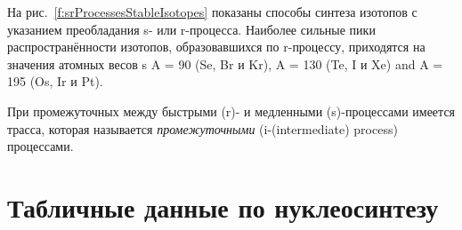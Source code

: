 \documentclass[a5paper,openany]{book}
\begin{document}



На рис.~\ref{f:srProcessesStableIsotopes} показаны способы синтеза изотопов с указанием преобладания s- или r-процесса.
Наиболее сильные пики распространённости изотопов, образовавшихся по r-процессу, приходятся на значения атомных весов s A = 90 (Se, Br и Kr), A = 130 (Te, I и Xe) and A = 195 (Os, Ir и Pt).


	
При промежуточных между быстрыми (r)- и медленными (s)-процессами имеется трасса, которая называется \emph{промежуточными} (i-(intermediate) process)  процессами. 
	
\section{Табличные данные по нуклеосинтезу}	 \label{s:TableNucleosynthesis}
\end{document}

